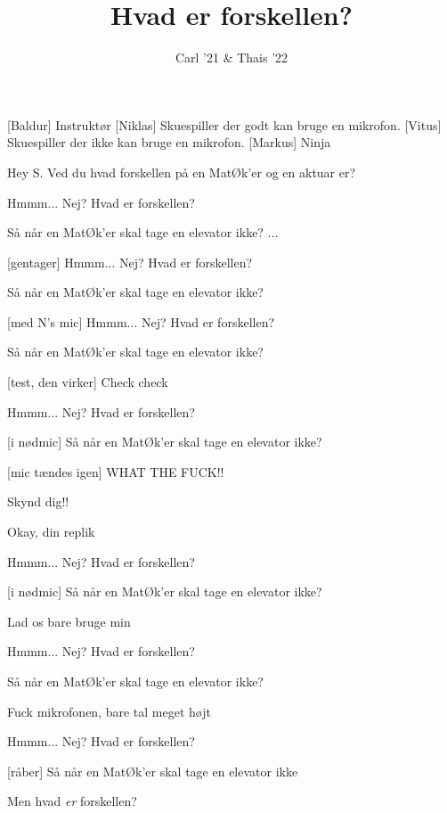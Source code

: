 \documentclass[a4paper,11pt]{article}
\title{Hvad er forskellen?}
\author{Carl '21 \& Thais '22}
\begin{document}
\maketitle

\begin{roles}
[Baldur] Instruktør
[Niklas] Skuespiller der godt kan bruge en mikrofon.
[Vitus] Skuespiller der ikke kan bruge en mikrofon.
[Markus] Ninja
\end{roles}

\begin{sketch}
 Hey S. Ved du hvad forskellen på en MatØk'er og en aktuar er?

 Hmmm... Nej? Hvad er forskellen?

 Så når en MatØk'er skal tage en elevator ikke? ... 

[gentager] Hmmm... Nej? Hvad er forskellen?

 Så når en MatØk'er skal tage en elevator ikke? 

[med N's mic] Hmmm... Nej? Hvad er forskellen?

 Så når en MatØk'er skal tage en elevator ikke? 


[test, den virker] Check check 

 Hmmm... Nej? Hvad er forskellen?

[i nødmic] Så når en MatØk'er skal tage en elevator ikke? 

[mic tændes igen] WHAT THE FUCK!!

 Skynd dig!!

 Okay, din replik


 Hmmm... Nej? Hvad er forskellen?

[i nødmic] Så når en MatØk'er skal tage en elevator ikke? 

 Lad os bare bruge min

 Hmmm... Nej? Hvad er forskellen?


 Så når en MatØk'er skal tage en elevator ikke? 

 Fuck mikrofonen, bare tal meget højt

 Hmmm... Nej? Hvad er forskellen?

[råber] Så når en MatØk'er skal tage en elevator ikke


 Men hvad \textit{er} forskellen?
\end{sketch}
\end{document}
